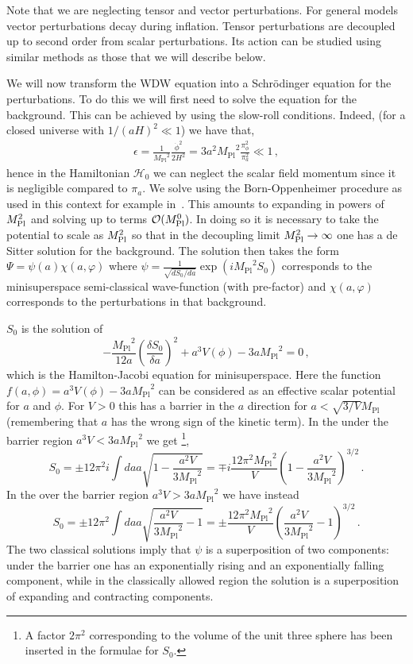 \documentclass[a4paper,11pt]{article}
\numberwithin{equation}{section}
\newcommand{\mpl}{{M_{\mathrm{Pl}}}}
\numberwithin{equation}{section}
\begin{document}
Note that we are neglecting tensor and vector perturbations. For general models  vector perturbations decay during inflation. Tensor perturbations are decoupled up to second order from scalar perturbations. Its action can be studied using similar methods as those that we will describe below.

We will now transform the WDW equation into a Schr\"odinger equation for the perturbations. To do this we will first need to solve the equation for the background. This can be achieved by using the slow-roll conditions.
Indeed, (for a closed universe with $1/(aH)^2\ll 1$) we have that,
\begin{align}
\epsilon= \frac{1}{\mpl^2}\frac{\dot\phi^2}{2H^2}=3 a^2\mpl^2\frac{\pi_\phi^2}{\pi_a^2}\ll 1 \,,
\end{align}
hence in the Hamiltonian $\mathcal{H}_0$ we can neglect the scalar field  momentum since it is negligible compared to $\pi_a$. We solve using the Born-Oppenheimer procedure as used in this context for example in~\cite{Banks:1984cw}. This amounts to expanding in powers of $M_{\rm Pl}^2$ and solving  up to terms $\mathcal{O}(M_{\rm Pl}^0)$. In doing so it is necessary to take the potential to scale as $M_{\rm Pl}^2$ so that in the decoupling limit $M_{\rm Pl}^2\rightarrow\infty$ one has a de Sitter solution for the background. The solution  then takes the form  $\Psi=\psi(a)\chi(a,\varphi)$ where 
$\psi=\frac{1}{\sqrt{dS_0/da}}\exp\left(i\mpl^2 S_0\right)$ corresponds to the  minisuperspace semi-classical wave-function (with pre-factor) and $\chi(a,\varphi)$ corresponds to the perturbations in that background.

$S_0$ is the solution of
\begin{equation}
-\frac{\mpl^2}{12a}\left(\frac{\delta S_0}{\delta a}\right)^2 +a^3 V(\phi)-3a\mpl^2=0 \,,
\end{equation} 
which is the Hamilton-Jacobi equation for minisuperspace. 
Here the function $f(a,\phi)=a^3 V(\phi)-3a\mpl^2$ can be considered as an effective scalar potential for $a$ and $\phi$. For $V>0$ this has a barrier in the $a$ direction for $a<\sqrt{3/V}\mpl$ (remembering that $a$ has the wrong sign of the kinetic term).
In the under the barrier region $a^3V<3a \mpl^2$ we get \footnote{A factor $2\pi^2$ corresponding to the volume of the unit three sphere has been inserted in the formulae for $S_0$.},
\begin{equation}
\label{eq:S0underthebarrier}
S_0=\pm 12\pi^2i \int da a \sqrt{1-\frac{a^2 V}{3\mpl^2}}=\mp i \frac{12\pi^2\mpl^2}{V}\left(1-\frac{a^2V}{3\mpl^2}\right)^{3/2} \,.
\end{equation}
In the over the barrier region $a^3V>3a\mpl^2$ we have instead
\begin{equation}
\label{eq:S0overthebarrier}
S_0=\pm 12\pi^2 \int da a \sqrt{\frac{a^2 V}{3\mpl^2}-1}=\pm  \frac{12\pi^2\mpl^2}{V}\left(\frac{a^2 V}{3\mpl^2}-1\right)^{3/2} \,.
\end{equation}
The two classical solutions imply that $\psi$ is a superposition of two components: under the barrier one has an exponentially rising and an exponentially falling component, while in the classically allowed region the solution is a superposition of expanding and contracting components.
 
\end{document}
